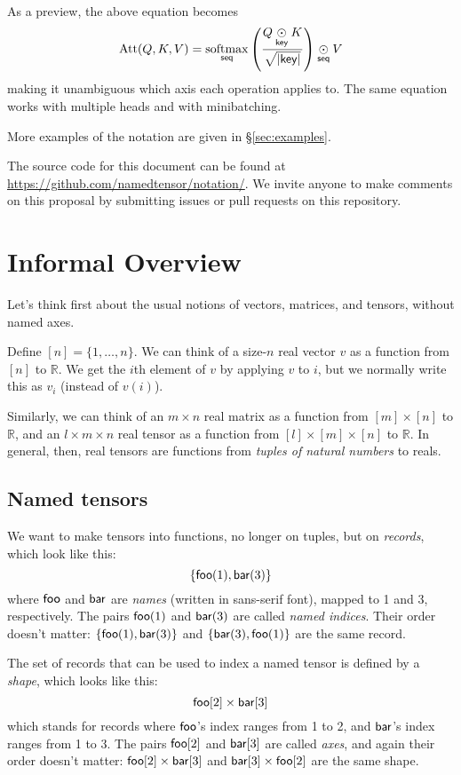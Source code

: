 \documentclass{article}
\begin{document}
As a preview, the above equation becomes
\begin{equation*}
  \text{Att}(Q,K,V) = \mathop{\underset{\mathsf{seq}}{\mathrm{softmax}}} \left( \frac{Q \mathbin{\underset{\mathsf{key}}{\odot}} K}{\sqrt{|\mathsf{key}|}} \right) \mathbin{\underset{\mathsf{seq}}{\odot}} V
\end{equation*}
making it unambiguous which axis each operation applies to. The same equation works with multiple heads and with minibatching.

More examples of the notation are given in \S\ref{sec:examples}.

The source code for this document can be found at \url{https://github.com/namedtensor/notation/}. We invite anyone to make comments on this proposal by submitting issues or pull requests on this repository.

\section{Informal Overview}
\label{sec:overview}

Let's think first about the usual notions of vectors, matrices, and tensors, without named axes.

Define $[n] = \{1, \ldots, n\}$. We can think of a size-$n$ real vector $v$ as a function from $[n]$ to $\mathbb{R}$. We get the $i$th element of $v$ by applying $v$ to $i$, but we normally write this as $v_i$ (instead of $v(i)$). 

Similarly, we can think of an $m \times n$ real matrix as a function from $[m] \times [n]$ to $\mathbb{R}$, and an $l \times m \times n$ real tensor as a function from $[l] \times [m] \times [n]$ to $\mathbb{R}$. In general, then, real tensors are functions from \emph{tuples of natural numbers} to reals.

\subsection{Named tensors}

We want to make tensors into functions, no longer on tuples, but on \emph{records}, which look like this: \[\{\mathsf{foo}(1), \mathsf{bar}(3)\}\] where $\mathsf{foo}$ and $\mathsf{bar}$ are \emph{names} (written in sans-serif font), mapped to 1 and 3, respectively. The pairs $\mathsf{foo}(1)$ and $\mathsf{bar}(3)$ are called \emph{named indices}. Their order doesn't matter: $\{\mathsf{foo}(1), \mathsf{bar}(3)\}$ and $\{\mathsf{bar}(3), \mathsf{foo}(1)\}$ are the same record.

The set of records that can be used to index a named tensor is defined by a \emph{shape}, which looks like this: \[\mathsf{foo}[2] \times \mathsf{bar}[3]\] which stands for records where $\mathsf{foo}$'s index ranges from 1 to 2, and $\mathsf{bar}$'s index ranges from 1 to 3. The pairs $\mathsf{foo}[2]$ and $\mathsf{bar}[3]$ are called \emph{axes}, and again their order doesn't matter: $\mathsf{foo}[2] \times \mathsf{bar}[3]$ and $\mathsf{bar}[3] \times \mathsf{foo}[2]$ are the same shape.
\end{document}
